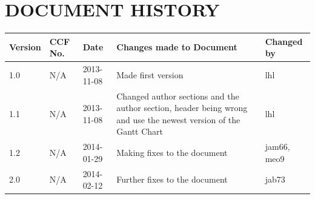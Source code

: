 \documentclass{project}
\begin{document}
\section*{DOCUMENT HISTORY}
\begin{tabular}{ | p{1.5cm} | p{1cm} | p{2cm} | p{6cm}| p{1.5cm}| }
\hline
Version & CCF No. & Date & Changes made to Document & Changed by \\
\hline
1.0 & N/A & 2013-11-08 & Made first version & lhl \\
\hline
1.1 & N/A & 2013-11-08 & Changed author sections and the author section, header being wrong and use the newest version of the Gantt Chart & lhl \\
\hline
1.2 & N/A & 2014-01-29 & Making fixes to the document & jam66, meo9\\
\hline
2.0 & N/A & 2014-02-12 & Further fixes to the document & jab73 \\
\hline
\end{tabular}
\label{thelastpage}
\end{document}
